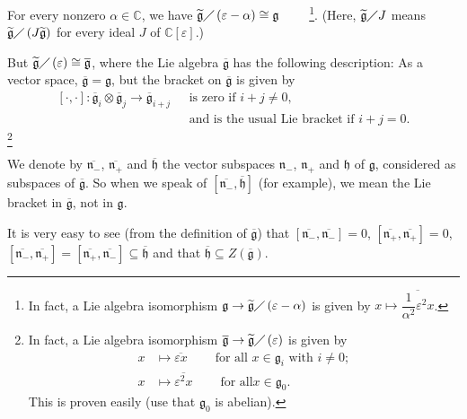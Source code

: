 \documentclass
[numbers=enddot,12pt,final,onecolumn,german,notitlepage]{scrartcl}%
\theoremstyle{definition}
\begin{document}
For every nonzero $\alpha\in\mathbb{C}$, we have $\widetilde{\mathfrak{g}%
}\diagup\left(  \varepsilon-\alpha\right)  \cong\mathfrak{g}$%
\ \ \ \ \footnote{In fact, a Lie algebra isomorphism $\mathfrak{g}%
\rightarrow\widetilde{\mathfrak{g}}\diagup\left(  \varepsilon-\alpha\right)  $
is given by $x\mapsto\overline{\dfrac{1}{\alpha^{2}}\varepsilon^{2}x}$.}.
(Here, $\widetilde{\mathfrak{g}}\diagup J$ means $\widetilde{\mathfrak{g}%
}\diagup\left(  J\widetilde{\mathfrak{g}}\right)  $ for every ideal $J$ of
$\mathbb{C}\left[  \varepsilon\right]  $.)

But $\widetilde{\mathfrak{g}}\diagup\left(  \varepsilon\right)  \cong%
\overline{\mathfrak{g}}$, where the Lie algebra $\overline{\mathfrak{g}}$ has
the following description: As a vector space, $\overline{\mathfrak{g}%
}=\mathfrak{g}$, but the bracket on $\overline{\mathfrak{g}}$ is given by%
\begin{align*}
\left[  \cdot,\cdot\right]  :\overline{\mathfrak{g}}_{i}\otimes\overline
{\mathfrak{g}}_{j}\rightarrow\overline{\mathfrak{g}}_{i+j}\text{ }  &
\text{is }\text{zero if }i+j\neq0\text{,}\\
&  \text{and is the usual Lie bracket if }i+j=0\text{.}%
\end{align*}
\footnote{In fact, a Lie algebra isomorphism $\overline{\mathfrak{g}%
}\rightarrow\widetilde{\mathfrak{g}}\diagup\left(  \varepsilon\right)  $ is
given by%
\begin{align*}
x  &  \mapsto\overline{\varepsilon x}\ \ \ \ \ \ \ \ \ \ \text{for all }%
x\in\mathfrak{g}_{i}\text{ with }i\neq0;\\
x  &  \mapsto\overline{\varepsilon^{2}x}\ \ \ \ \ \ \ \ \ \ \text{for all
}x\in\mathfrak{g}_{0}.
\end{align*}
This is proven easily (use that $\mathfrak{g}_{0}$ is abelian).}

We denote by $\overline{\mathfrak{n}_{-}}$, $\overline{\mathfrak{n}_{+}}$ and
$\overline{\mathfrak{h}}$ the vector subspaces $\mathfrak{n}_{-}$,
$\mathfrak{n}_{+}$ and $\mathfrak{h}$ of $\mathfrak{g}$, considered as
subspaces of $\overline{\mathfrak{g}}$. So when we speak of $\left[
\overline{\mathfrak{n}_{-}},\overline{\mathfrak{h}}\right]  $ (for example),
we mean the Lie bracket in $\overline{\mathfrak{g}}$, not in $\mathfrak{g}$.

It is very easy to see (from the definition of $\overline{\mathfrak{g}}$) that
$\left[  \overline{\mathfrak{n}_{-}},\overline{\mathfrak{n}_{-}}\right]  =0$,
$\left[  \overline{\mathfrak{n}_{+}},\overline{\mathfrak{n}_{+}}\right]  =0$,
$\left[  \overline{\mathfrak{n}_{-}},\overline{\mathfrak{n}_{+}}\right]
=\left[  \overline{\mathfrak{n}_{+}},\overline{\mathfrak{n}_{-}}\right]
\subseteq\overline{\mathfrak{h}}$ and that $\overline{\mathfrak{h}}\subseteq
Z\left(  \overline{\mathfrak{g}}\right)  $.
\end{document}
